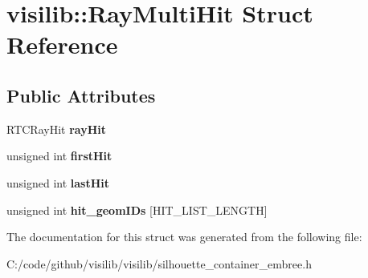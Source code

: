 \hypertarget{structvisilib_1_1_ray_multi_hit}{}\section{visilib\+::Ray\+Multi\+Hit Struct Reference}
\label{structvisilib_1_1_ray_multi_hit}
\subsection*{Public Attributes}
\begin{DoxyCompactItemize}
\item 
\mbox{\label{structvisilib_1_1_ray_multi_hit_a3f8a378c9a5b213d64f0616262322dad}} 
R\+T\+C\+Ray\+Hit {\bfseries ray\+Hit}
\item 
\mbox{\label{structvisilib_1_1_ray_multi_hit_a6a0dcd46cec9bc639a43b2151b05105a}} 
unsigned int {\bfseries first\+Hit}
\item 
\mbox{\label{structvisilib_1_1_ray_multi_hit_a03e1f83d769c1405441cc31afc7d67fc}} 
unsigned int {\bfseries last\+Hit}
\item 
\mbox{\label{structvisilib_1_1_ray_multi_hit_abd9e86ea3f60605b165a9ff24ceb2e35}} 
unsigned int {\bfseries hit\+\_\+geom\+I\+Ds} \mbox{[}H\+I\+T\+\_\+\+L\+I\+S\+T\+\_\+\+L\+E\+N\+G\+TH\mbox{]}
\end{DoxyCompactItemize}


The documentation for this struct was generated from the following file\+:\begin{DoxyCompactItemize}
\item 
C\+:/code/github/visilib/visilib/silhouette\+\_\+container\+\_\+embree.\+h\end{DoxyCompactItemize}
